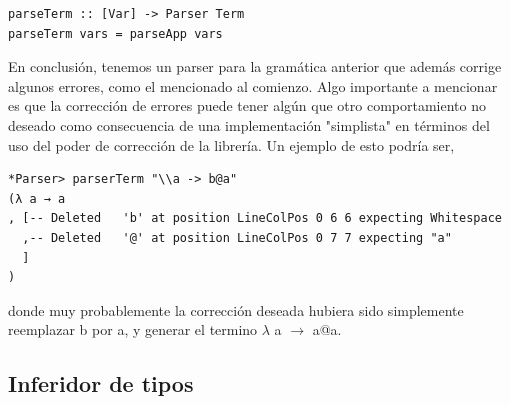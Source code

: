 \documentclass[a4paper,10pt]{article}
\begin{document}
\begin{lstlisting}
parseTerm :: [Var] -> Parser Term
parseTerm vars = parseApp vars
\end{lstlisting}

En conclusión, tenemos un parser para la gramática anterior que además corrige 
algunos errores, como el mencionado al comienzo. Algo importante a mencionar es
que la corrección de errores puede tener algún que otro comportamiento no deseado
como consecuencia de una implementación "simplista" en términos del uso del 
poder de corrección de la librería. Un ejemplo de esto podría ser,

\begin{verbatim}
*Parser> parserTerm "\\a -> b@a"
(λ a → a
, [-- Deleted   'b' at position LineColPos 0 6 6 expecting Whitespace
  ,-- Deleted   '@' at position LineColPos 0 7 7 expecting "a"
  ]
)
\end{verbatim}

donde muy probablemente la corrección deseada hubiera sido simplemente reemplazar
b por a, y generar el termino $\lambda$ a $\rightarrow$ a@a.


\subsection{Inferidor de tipos}
 
\end{document}
